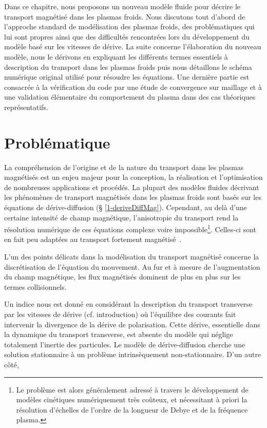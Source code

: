 \begin{refsection}


Dans ce chapitre, nous proposons un nouveau modèle fluide pour décrire le
transport magnétisé dans les plasmas froids. Nous discutons tout d'abord de
l'approche standard de modélisation des plasmas froids, des problématiques qui
lui sont propres ainsi que des difficultés rencontrées lors du développement du
modèle basé sur les vitesses de dérive. La suite concerne l'élaboration du
nouveau modèle, nous le dérivons en expliquant les différents termes essentiels
à description du transport dans les plasmas froids puis nous détaillons le
schéma numérique original utilisé pour résoudre les équations.
Une dernière partie est consacrée à la vérification du code par une étude de
convergence sur maillage et à une validation élémentaire du comportement du
plasma dans des cas théoriques représentatifs.



\section{Problématique}

La compréhension de l'origine et de la nature du transport dans les plasmas
magnétisés est un enjeu majeur pour la conception, la réalisation et
l'optimisation de nombreuses applications et procédés. La plupart des modèles
fluides décrivant les phénomènes de transport magnétisés dans les plasmas
froids sont basés sur les équations de dérive-diffusion (\S
\ref{1-deriveDiffMag}). Cependant, au delà d'une certaine intensité de champ
magnétique, l'anisotropie du transport rend la résolution numérique de ces
équations complexe voire impossible\footnote{Le problème est alors généralement
adressé à travers le développement de modèles cinétiques numériquement très
coûteux, et nécessitant à priori la résolution d'échelles de l'ordre de la
longueur de Debye et de la fréquence plasma.}.
Celles-ci sont en fait peu adaptées au transport fortement
magnétisé~\parencite{Golant}.

L'un des points délicats dans la modélisation du transport magnétisé concerne la
discrétisation de l'équation du mouvement. Au fur et à mesure de l'augmentation
du champ magnétique, les flux magnétisés dominent de plus en plus sur les termes
collisionnels.

Un indice nous est donné en considérant la description du transport transverse
par les vitesses de dérive (cf.
introduction) où l'équilibre des courants fait intervenir la divergence de la
dérive de polarisation. Cette dérive, essentielle dans la dynamique du transport
transverse, est absente du modèle qui néglige totalement l'inertie des
particules. Le modèle de dérive-diffusion cherche une solution stationnaire à un
problème intrinsèquement non-stationnaire.
\parencite{Fruchtman}
\parencite{Sternberg}
D'un autre côté,


\end{refsection}
